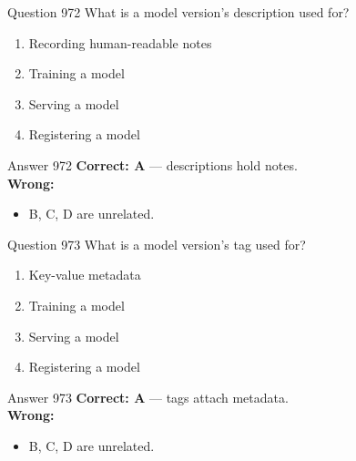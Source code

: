 \documentclass[aspectratio=169,11pt]{beamer}
\begin{document}
	\begin{frame}{Question 972}
		What is a model version's description used for?
		\begin{enumerate}[label=\Alph*.]
			\item Recording human-readable notes
			\item Training a model
			\item Serving a model
			\item Registering a model
		\end{enumerate}
	\end{frame}
	\begin{frame}{Answer 972}
		\textbf{Correct: A} --- descriptions hold notes.\\
		\vspace{0.5em}
		\textbf{Wrong:}
		\begin{itemize}
			\item B, C, D are unrelated.
		\end{itemize}
	\end{frame}
	
	\begin{frame}{Question 973}
		What is a model version's tag used for?
		\begin{enumerate}[label=\Alph*.]
			\item Key-value metadata
			\item Training a model
			\item Serving a model
			\item Registering a model
		\end{enumerate}
	\end{frame}
	\begin{frame}{Answer 973}
		\textbf{Correct: A} --- tags attach metadata.\\
		\vspace{0.5em}
		\textbf{Wrong:}
		\begin{itemize}
			\item B, C, D are unrelated.
		\end{itemize}
	\end{frame}
	
\end{document}
